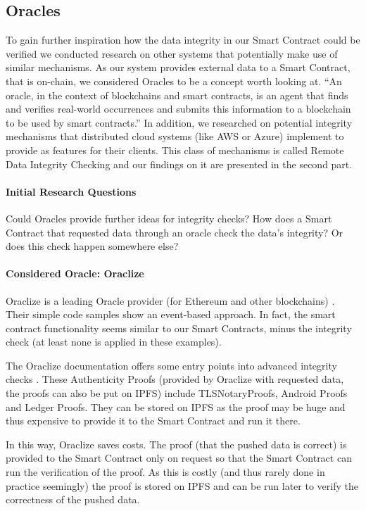 \subsection{Oracles}
To gain further inspiration how the data integrity in our Smart Contract could be verified we conducted research on other systems that potentially make use of similar mechanisms. As our system provides external data to a Smart Contract, that is on-chain, we considered Oracles to be a concept worth looking at. “An oracle, in the context of blockchains and smart contracts, is an agent that finds and verifies real-world occurrences and submits this information to a blockchain to be used by smart contracts.” \autocite{relatedWork01} In addition, we researched on potential integrity mechanisms that distributed cloud systems (like AWS or Azure) implement to provide as features for their clients. This class of mechanisms is called Remote Data Integrity Checking and our findings on it are presented in the second part.

\paragraph{Initial Research Questions}
Could Oracles provide further ideas for integrity checks? How does a Smart Contract that requested data through an oracle check the data’s integrity? Or does this check happen somewhere else?

\paragraph{Considered Oracle: Oraclize}
Oraclize is a leading Oracle provider (for Ethereum and other blockchains) \autocite{relatedWork02}. Their simple code samples \autocite{relatedWork03} show an event-based approach. In fact, the smart contract functionality seems similar to our Smart Contracts, minus the integrity check (at least none is applied in these examples).

The Oraclize documentation offers some entry points into advanced integrity checks \autocite{relatedWork04}. These Authenticity Proofs (provided by Oraclize with requested data, the proofs can also be put on IPFS) \autocite{relatedWork05} include TLSNotaryProofs, Android Proofs and Ledger Proofs. They can be stored on IPFS as the proof may be huge and thus expensive to provide it to the Smart Contract and run it there. \autocite{relatedWork06}

In this way, Oraclize saves costs. The proof (that the pushed data is correct) is provided to the Smart Contract only on request so that the Smart Contract can run the verification of the proof. As this is costly (and thus rarely done in practice seemingly) the proof is stored on IPFS and can be run later to verify the correctness of the pushed data.

